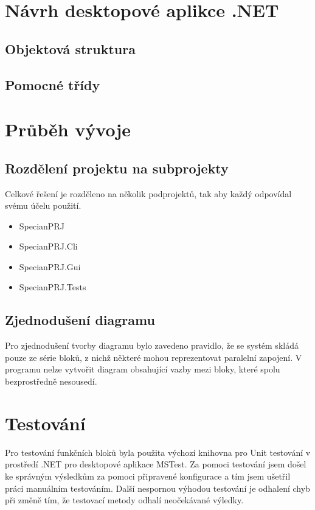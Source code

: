 \documentclass[FM,RP]{tulthesis}
\begin{document}
\chapter{Návrh desktopové aplikce .NET}
    \section{Objektová struktura}
        
    \section{Pomocné třídy}

\chapter{Průběh vývoje}
    \section{Rozdělení projektu na subprojekty}
        Celkové řešení je rozděleno na několik podprojektů, tak aby každý odpovídal svému účelu použití.
        \begin{itemize} 
        \item SpecianPRJ
        \item SpecianPRJ.Cli
        \item SpecianPRJ.Gui
        \item SpecianPRJ.Tests
        \end{itemize}
    \section{Zjednodušení diagramu}
        Pro zjednodušení tvorby diagramu bylo zavedeno pravidlo, že se systém skládá pouze ze série bloků, z nichž některé mohou reprezentovat paralelní zapojení.
        V programu nelze vytvořit diagram obsahující vazby mezi bloky, které spolu bezprostředně nesousedí.
\chapter{Testování}

    Pro testování funkčních bloků byla použita výchozí knihovna pro Unit testování v prostředí .NET pro desktopové aplikace MSTest.
    Za pomoci testování jsem došel ke správným výsledkům za pomoci připravené konfigurace a tím jsem ušetřil práci manuálním testováním.
    Další nespornou výhodou testování je odhalení chyb při změně tím,  že testovací metody odhalí neočekávané výledky.
\end{document}
